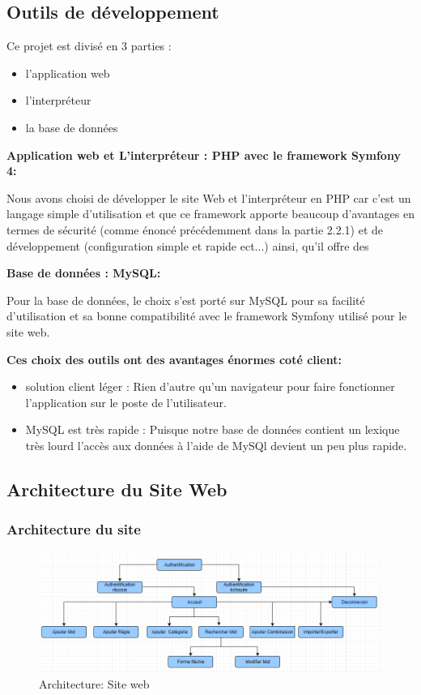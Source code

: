 \documentclass[12pt,a4paper]{article}
\begin{document}
\subsection{Outils de développement}

Ce projet est divisé en 3 parties :
\begin{itemize}  
  \item l'application web
  \item l'interpréteur
  \item la base de données
\end{itemize}

\textbf{Application web et L'interpréteur : PHP avec le framework Symfony 4:}

Nous avons choisi de développer le site Web et l'interpréteur en PHP car c'est un langage simple d'utilisation et que ce framework apporte beaucoup d'avantages en termes de sécurité (comme énoncé précédemment dans la partie 2.2.1) et de développement (configuration simple et rapide ect...) ainsi, qu'il offre des 

\smallbreak

\textbf{Base de données : MySQL:}


Pour la base de données, le choix s'est porté sur MySQL pour sa facilité d'utilisation et sa bonne compatibilité avec le framework Symfony utilisé pour le site web. 


\textbf{Ces choix des outils ont des avantages énormes coté client:}

\begin{itemize}  
  \item solution client léger : Rien d'autre qu'un navigateur pour faire fonctionner l'application sur le poste de l'utilisateur.
  \item MySQL est très rapide : Puisque notre base de données contient un lexique très lourd l'accès aux données à l'aide de MySQl devient un peu plus rapide.
\end{itemize}

\subsection{ Architecture du Site Web }
\subsubsection{Architecture du site} 



\begin{figure}[!p]
\centering
\includegraphics{img/site.PNG}
\caption{Architecture: Site web}
\label{Tux}
\end{figure}
\end{document}
